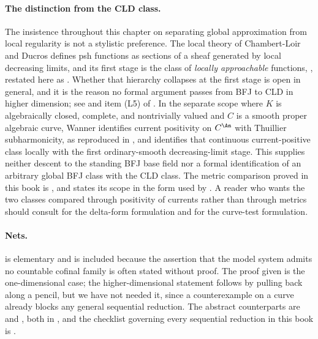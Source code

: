 \paragraph{The distinction from the CLD class.}
The insistence throughout this chapter on separating global approximation
from local regularity is not a stylistic preference.  The local theory of
Chambert-Loir and Ducros \cite{CLD25} defines psh functions as sections of a
sheaf generated by local decreasing limits, and its first stage is the class
of \emph{locally approachable} functions,
\cite[Definition~8.1.13]{CLD25}, restated here as
.  Whether that hierarchy collapses at the first
stage is open in general, and it is the reason no formal argument passes from
BFJ to CLD in higher dimension; see
 and item (L5) of
.  In the separate scope where $K$ is
algebraically closed, complete, and nontrivially valued and $C$ is a smooth
proper algebraic curve, Wanner \cite{Wanner19} identifies current positivity
on $C^{\An}$ with Thuillier subharmonicity, as reproduced in
, and
 identifies that
continuous current-positive class locally with the first ordinary-smooth
decreasing-limit stage.  This supplies neither descent to the standing BFJ
base field nor a formal identification of an arbitrary global BFJ class with
the CLD class.  The metric comparison proved in this book is
, and
 states its scope in the form used by
.  A reader who wants the two classes compared through
positivity of currents rather than through metrics should consult
\cite{GK17,GK19} for the delta-form formulation and
\cite{GR25Classical,GR25PL} for the curve-test formulation.

\paragraph{Nets.}
 is elementary and is included because
the assertion that the model system admits no countable cofinal family is
often stated without proof.  The proof given is the one-dimensional case;
the higher-dimensional statement follows by pulling back along a pencil, but
we have not needed it, since a counterexample on a curve already blocks any
general sequential reduction.  The abstract counterparts are
 and
, both in
, and the checklist governing every sequential
reduction in this book is .


